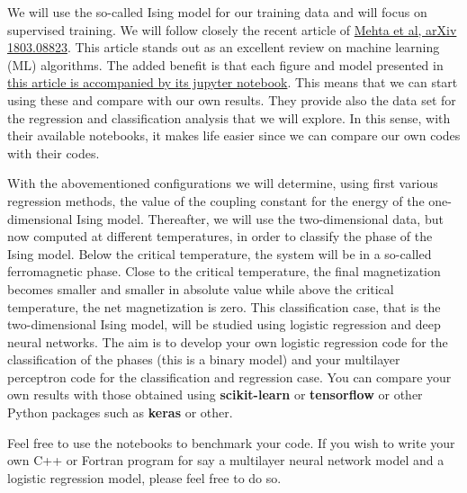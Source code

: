 \documentclass[%
oneside,                 %
final,                   %
10pt]{article}
\begin{document}
We will use the so-called Ising model for  our training data and will
focus on supervised training. We will follow closely the recent
article of \href{{https://arxiv.org/abs/1803.08823}}{Mehta et al, arXiv
1803.08823}. This article stands
out as an excellent review on machine learning (ML) algorithms.
The added benefit is that each figure and
model presented in \href{{https://physics.bu.edu/~pankajm/MLnotebooks.html}}{this article is accompanied by its jupyter
notebook}. This
means that we can start using these and compare with our own results.
They provide also the data set for the regression and classification
analysis that we will explore.  In this sense, with their available
notebooks, it makes life easier since we can compare our own codes
with their codes.




With the abovementioned configurations we will determine, using first
various regression methods, the value of the coupling constant for the
energy of the one-dimensional Ising model. Thereafter, we will use the
two-dimensional data, but now computed at different temperatures, in
order to classify the phase of the Ising model. Below the critical
temperature, the system will be in a so-called ferromagnetic
phase. Close to the critical temperature, the final magnetization
becomes smaller and smaller in absolute value while above the critical
temperature, the net magnetization is zero.  This classification case,
that is the two-dimensional Ising model, will be studied using
logistic regression and deep neural networks.  The aim is to develop
your own logistic regression code for the classification of the phases
(this is a binary model) and your multilayer perceptron code for the
classification and regression case. You can compare your own results with those obtained
using \textbf{scikit-learn} or \textbf{tensorflow} or other Python packages such as \textbf{keras} or other.


Feel free to use the notebooks to benchmark your code.  If you wish to
write your own C++ or Fortran program for say a multilayer neural network
model and a logistic regression model, please feel free to do so.  
\end{document}
